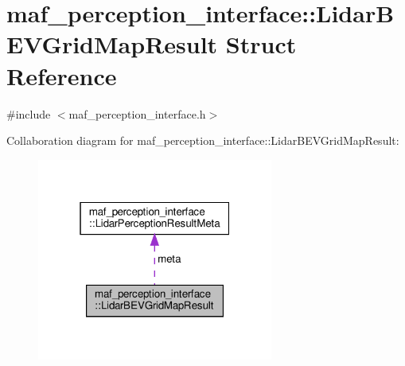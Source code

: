 \hypertarget{structmaf__perception__interface_1_1LidarBEVGridMapResult}{}\section{maf\+\_\+perception\+\_\+interface\+:\+:Lidar\+B\+E\+V\+Grid\+Map\+Result Struct Reference}
\label{structmaf__perception__interface_1_1LidarBEVGridMapResult}


{\ttfamily \#include $<$maf\+\_\+perception\+\_\+interface.\+h$>$}



Collaboration diagram for maf\+\_\+perception\+\_\+interface\+:\+:Lidar\+B\+E\+V\+Grid\+Map\+Result\+:\nopagebreak
\begin{figure}[H]
\begin{center}
\leavevmode
\includegraphics[width=220pt]{structmaf__perception__interface_1_1LidarBEVGridMapResult__coll__graph}
\end{center}
\end{figure}
